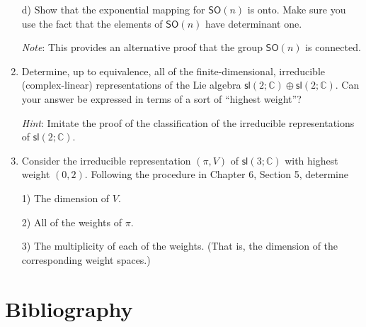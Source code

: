 \documentclass{amsbook}
\theoremstyle{plain}
\numberwithin{equation}{chapter}
\numberwithin{theorem}{chapter}
\begin{document}
\begin{enumerate}
d) Show that the exponential mapping for $\mathsf{SO}(n)$ is onto. Make sure
you use the fact that the elements of $\mathsf{SO}(n)$ have determinant one.

\textit{Note}: This provides an alternative proof that the group
$\mathsf{SO}(n)$ is connected.

\item  Determine, up to equivalence, all of the finite-dimensional,
irreducible (complex-linear) representations of the Lie algebra $\mathsf{sl}%
(2;\mathbb{C})\oplus\mathsf{sl}(2;\mathbb{C})$. Can your answer be expressed
in terms of a sort of ``highest weight''?

\textit{Hint}: Imitate the proof of the classification of the irreducible
representations of $\mathsf{sl}(2;\mathbb{C})$.

\item  Consider the irreducible representation $\left(  \pi,V\right)  $ of
$\mathsf{sl}\left(  3;\mathbb{C}\right)  $ with highest weight $\left(
0,2\right)  $. Following the procedure in Chapter 6, Section 5, determine

1) The dimension of $V$.

2) All of the weights of $\pi$.

3) The multiplicity of each of the weights. (That is, the dimension of the
corresponding weight spaces.)
\end{enumerate}

\chapter{Bibliography}
\end{document}
